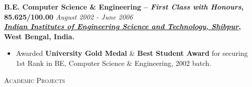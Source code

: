 \documentclass[9pt]{article}
\newenvironment{changemargin}[2]{%
  \begin{list}{}{%
    \setlength{\topsep}{0pt}%
    \setlength{\leftmargin}{#1}%
    \setlength{\rightmargin}{#2}%
    \setlength{\listparindent}{\parindent}%
    \setlength{\itemindent}{\parindent}%
    \setlength{\parsep}{\parskip}%
  }%
  \item[]}{\end{list}
}
\newcommand{\lineover}{
	\begin{changemargin}{-0.05in}{-0.05in}
		\vspace*{-8pt}
		\hrulefill \\
		\vspace*{-2pt}
	\end{changemargin}
}
\newcommand{\header}[1]{
	\begin{changemargin}{-0.5in}{-0.5in}
		\scshape{#1}\\
  	\lineover
	\end{changemargin}
}
\newenvironment{body} {
	\vspace*{-16pt}
	\begin{changemargin}{-0.25in}{-0.5in}
  }	
	{\end{changemargin}
}
\begin{document}
\begin{body}
  \medskip
	\textbf{B.E. Computer Science \& Engineering -- \emph{First Class with Honours}, 85.625/100.00} \hfill \emph{August 2002 - June 2006} \\
	\textbf{\emph{\href{http://www.iiests.ac.in/}{Indian Institutes of Engineering Science and Technology, Shibpur}}, West Bengal, India.}\\
	\begin{itemize} \itemsep -0pt
		\item Awarded \textbf{University Gold Medal} \& \textbf{Best Student Award} for securing 1st Rank in BE, Computer Science \& Engineering, 2002 batch.
	\end{itemize}
\end{body}

\smallskip

\newpage
\header{Academic Projects}
\end{document}
